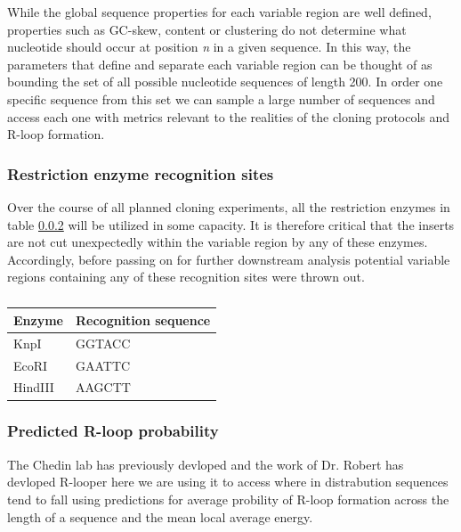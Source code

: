 \documentclass[11pt]{article}
\begin{document}


While the global sequence properties for each variable region are well defined, properties such as GC-skew, content or clustering do not determine what nucleotide should occur at position \emph{n} in a given sequence. In this way, the parameters that define and separate each variable region can be thought of as bounding the set of all possible nucleotide sequences of length 200. In order one specific sequence from this set we can sample a large number of sequences and access each one with metrics relevant to the realities of the cloning protocols and R-loop formation. 


\subsubsection{Restriction enzyme recognition sites}

Over the course of all planned cloning experiments, all the restriction enzymes in table \ref{} will be utilized in some capacity. It is therefore critical that the inserts are not cut unexpectedly within the variable region by any of these enzymes. Accordingly, before passing on for further downstream analysis potential variable regions containing any of these recognition sites were thrown out. 

\begin{table}[H]
	\caption{}
	\centering
	\begin{tabular}{@{}ll@{}}
		\toprule
		Enzyme  & Recognition sequence \\ \midrule
		KnpI    & GGTACC               \\
		EcoRI   & GAATTC               \\
		HindIII & AAGCTT               \\ \bottomrule
	\end{tabular}
\end{table}


\subsubsection{Predicted R-loop probability}

The Chedin lab has previously devloped and the work of Dr. Robert has devloped R-looper here we are using it to access where in distrabution sequences tend to fall using predictions for average probility of R-loop formation across the length of a sequence and the mean local average energy. 
\end{document}

